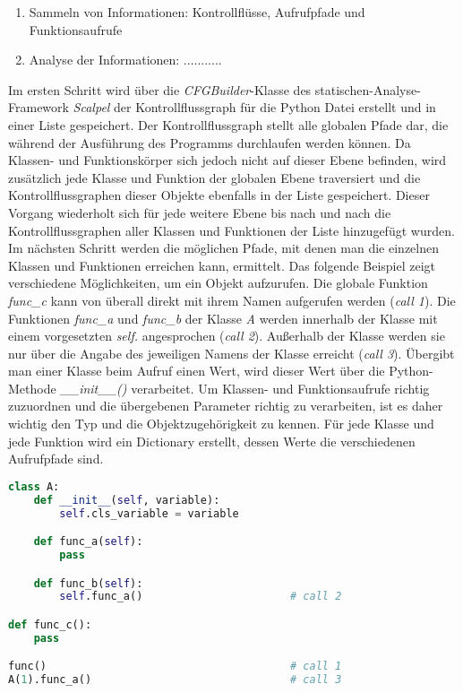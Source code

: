 \documentclass[german,bachelor]{swsLeipzig}
\begin{document}
\begin{enumerate}
 \item Sammeln von Informationen: Kontrollflüsse, Aufrufpfade und Funktionsaufrufe
 \item Analyse der Informationen: ...........
\end{enumerate}

Im ersten Schritt wird über die \textit{CFGBuilder}-Klasse des statischen-Analyse-Framework \textit{Scalpel} der
Kontrollflussgraph für die Python Datei erstellt und in einer Liste gespeichert.
Der Kontrollflussgraph stellt alle globalen Pfade dar, die während der Ausführung des Programms durchlaufen werden können.
Da Klassen- und Funktionskörper sich jedoch nicht auf dieser Ebene befinden, wird zusätzlich jede Klasse und Funktion
der globalen Ebene traversiert und die Kontrollflussgraphen dieser Objekte ebenfalls in der Liste gespeichert.
Dieser Vorgang wiederholt sich für jede weitere Ebene bis nach und nach die Kontrollflussgraphen aller
Klassen und Funktionen der Liste hinzugefügt wurden. \\

Im nächsten Schritt werden die möglichen Pfade, mit denen man die einzelnen Klassen und Funktionen erreichen kann, ermittelt.
Das folgende Beispiel zeigt verschiedene Möglichkeiten, um ein Objekt aufzurufen.
Die globale Funktion \textit{func\_c} kann von überall direkt mit ihrem Namen aufgerufen werden (\textit{call 1}).
Die Funktionen \textit{func\_a} und \textit{func\_b} der Klasse \textit{A} werden innerhalb der Klasse mit einem vorgesetzten
\textit{self.} angesprochen (\textit{call 2}).
Außerhalb der Klasse werden sie nur über die Angabe des jeweiligen Namens der Klasse erreicht (\textit{call 3}).
Übergibt man einer Klasse beim Aufruf einen Wert, wird dieser Wert über die Python-Methode \textit{\_\_init\_\_()} verarbeitet.
Um Klassen- und Funktionsaufrufe richtig zuzuordnen und die übergebenen Parameter richtig zu verarbeiten,
ist es daher wichtig den Typ und die Objektzugehörigkeit zu kennen.
Für jede Klasse und jede Funktion wird ein Dictionary erstellt, dessen Werte die verschiedenen Aufrufpfade sind. \\

\begin{lstlisting}[language=Python, frame=single, basicstyle=\small]
class A:
    def __init__(self, variable):
        self.cls_variable = variable

    def func_a(self):
        pass

    def func_b(self):
        self.func_a()                       # call 2

def func_c():
    pass

func()                                      # call 1
A(1).func_a()                               # call 3
\end{lstlisting}
\
\end{document}

